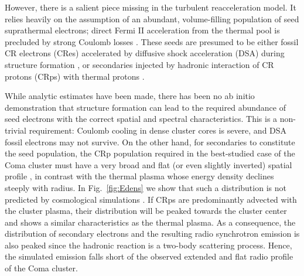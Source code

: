 \documentclass[fleqn,usenatbib,useAMS]{mnras}
\begin{document}
However, there is a salient piece missing in the turbulent
reacceleration model. It relies heavily on the assumption of an
abundant, volume-filling population of seed suprathermal electrons;
direct Fermi II acceleration from the thermal pool is precluded by
strong Coulomb losses
\citep{2008ApJ...682..175P,2012ApJ...759..113C}. These seeds are
presumed to be either fossil CR electrons (CRes) accelerated by
diffusive shock acceleration (DSA) during structure formation
\citep{1999ApJ...520..529S}, or secondaries injected by hadronic
interaction of CR protons (CRps) with thermal protons
\citep{brunetti11}.

While analytic estimates have been made, there has been no ab initio
demonstration that structure formation can lead to the required
abundance of seed electrons with the correct spatial and spectral
characteristics. This is a non-trivial requirement: Coulomb cooling in
dense cluster cores is severe, and DSA fossil electrons may not
survive. On the other hand, for secondaries to constitute the seed
population, the CRp population required in the best-studied case of
the Coma cluster must have a very broad and flat (or even slightly
inverted) spatial profile \citep{brunetti12}, in contrast with the
thermal plasma whose energy density declines steeply with radius. In
Fig.~\ref{fig:Edens} we show that such a distribution is not predicted
by cosmological simulations \cite[see
  also][]{pinzke10,2014MNRAS.439.2662V}. If CRps are predominantly
advected with the cluster plasma, their distribution will be peaked
towards the cluster center and shows a similar characteristics as the
thermal plasma. As a consequence, the distribution of secondary
electrons and the resulting radio synchrotron emission is also peaked
since the hadronic reaction is a two-body scattering process. Hence,
the simulated emission falls short of the observed extended and flat
radio profile of the Coma cluster.
\end{document}
